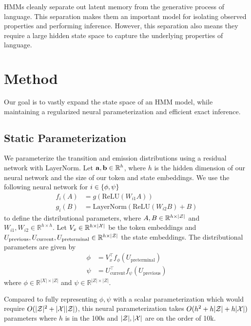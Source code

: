 \documentclass[11pt,a4paper]{article}
\begin{document}
HMMs cleanly separate out latent memory from the generative process of language.
This separation makes them an important model for isolating observed properties and performing inference.
However, this separation also means they require a large hidden state space to
capture the underlying properties of language. 

\section{Method}

Our goal is to vastly expand the state space of an HMM model, while maintaining 
a regularized neural parameterization and efficient exact inference. 

\subsection{Static Parameterization}
We parameterize the transition and emission distributions using a residual network
with LayerNorm.
Let $\mathbf{a},\mathbf{b}\in\mathbb{R}^h$, where $h$ is the hidden dimension of our neural network
and the size of our token and state embeddings.
We use the following neural network for $i \in \left\{\phi,\psi\right\}$
\begin{equation}
\begin{aligned}
f_i(A) &= g(\textrm{ReLU}(W_{i1}A))\\
g_i(B) &= \textrm{LayerNorm}(\textrm{ReLU}(W_{i2}B) + B)
\end{aligned}
\end{equation}
to define the distributional parameters,
where $A,B\in\mathbb{R}^{h \times |\mathcal{Z}|}$ and $W_{i1},W_{i2} \in \mathbb{R}^{h \times h}$.
Let $V_x \in \mathbb{R}^{h \times |\mathcal{X}|}$ be the token embeddings
and $U_{\textrm{previous}},U_{\textrm{current}},U_\textrm{preterminal}
\in \mathbb{R}^{h \times |\mathcal{Z}|}$ the state embeddings.
The distributional parameters are given by
\begin{equation}
\begin{aligned}
\phi &= V_x^\top f_\phi(U_\textrm{preterminal})\\
\psi &= U_\textrm{current}^\top f_\psi(U_\textrm{previous})
\end{aligned}
\end{equation}
where $\phi \in \mathbb{R}^{|X|\times|Z|}$ and $\psi \in \mathbb{R}^{|Z|\times|Z|}$.

Compared to fully representing $\phi,\psi$ with a scalar parameterization
which would require $O(|\mathcal{Z}|^2 + |\mathcal{X}||\mathcal{Z}|)$,
this neural parameterization takes $O(h^2 + h|\mathcal{Z}| + h|\mathcal{X}|)$ parameters
where $h$ is in the 100s and $|\mathcal{Z}|,|\mathcal{X}|$ are on the order of 10k.
\end{document}
